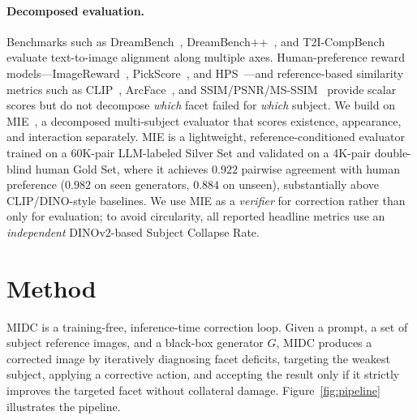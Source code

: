 \documentclass[letterpaper]{article}
\begin{document}
\paragraph{Decomposed evaluation.} Benchmarks such as DreamBench~\citep{ruiz2023dreambooth}, DreamBench++~\citep{peng2024dreambench++}, and T2I-CompBench~\citep{huang2023t2i} evaluate text-to-image alignment along multiple axes. Human-preference reward models---ImageReward~\citep{xu2023imagereward}, PickScore~\citep{kirstain2023pick}, and HPS~\citep{wu2023human}---and reference-based similarity metrics such as CLIP~\citep{radford2021learning}, ArcFace~\citep{deng2019arcface}, and SSIM/PSNR/MS-SSIM~\citep{wang2004image,hore2010image,wang2003multiscale} provide scalar scores but do not decompose \emph{which} facet failed for \emph{which} subject. We build on MIE~\citep{anon2025mibe}, a decomposed multi-subject evaluator that scores existence, appearance, and interaction separately. MIE is a lightweight, reference-conditioned evaluator trained on a 60K-pair LLM-labeled Silver Set and validated on a 4K-pair double-blind human Gold Set, where it achieves $0.922$ pairwise agreement with human preference ($0.982$ on seen generators, $0.884$ on unseen), substantially above CLIP/DINO-style baselines. We use MIE as a \emph{verifier} for correction rather than only for evaluation; to avoid circularity, all reported headline metrics use an \emph{independent} DINOv2-based Subject Collapse Rate.

\section{Method}

MIDC is a training-free, inference-time correction loop. Given a prompt, a set of subject reference images, and a black-box generator $G$, MIDC produces a corrected image by iteratively diagnosing facet deficits, targeting the weakest subject, applying a corrective action, and accepting the result only if it strictly improves the targeted facet without collateral damage. Figure~\ref{fig:pipeline} illustrates the pipeline.
\end{document}
